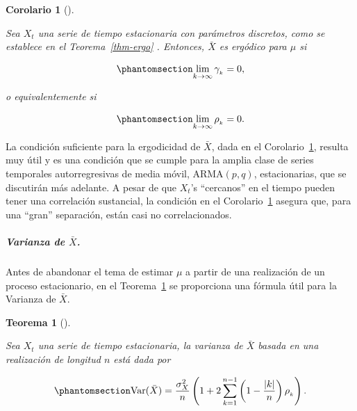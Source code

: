 \documentclass[
  us-letterpaper,
]{scrreprt}
\let\oldsubparagraph\subparagraph
\renewcommand{\subparagraph}[1]{\oldsubparagraph{#1}\mbox{}}
\theoremstyle{plain}
\newtheorem{corollary}{Corolario}[chapter]
\theoremstyle{definition}
\theoremstyle{definition}
\theoremstyle{plain}
\newtheorem{theorem}{Teorema}[chapter]
\theoremstyle{remark}
\begin{document}
\begin{corollary}[]\protect\hypertarget{cor-ergo}{}\label{cor-ergo}

Sea \(X_t\) una serie de tiempo estacionaria con parámetros discretos,
como se establece en el Teorema~\ref{thm-ergo} . Entonces, \(\bar X\) es
ergódico para \(\mu\) si

\begin{equation}\phantomsection\label{eq-ergo1}{
\lim\limits_{k\to\infty} \gamma_{_k}=0,
}\end{equation}

o equivalentemente si

\begin{equation}\phantomsection\label{eq-ergo2}{
\lim\limits_{k\to\infty} \rho_{_k}=0.
}\end{equation}

\end{corollary}

La condición suficiente para la ergodicidad de \(\bar X\), dada en el
Corolario~\ref{cor-ergo}, resulta muy útil y es una condición que se
cumple para la amplia clase de series temporales autorregresivas de
media móvil, ARMA\((p,q)\), estacionarias, que se discutirán más
adelante. A pesar de que \(X_t\)'s ``cercanos'' en el tiempo pueden
tener una correlación sustancial, la condición en el
Corolario~\ref{cor-ergo} asegura que, para una ``gran'' separación,
están casi no correlacionados.

\subparagraph{\texorpdfstring{Varianza de
\(\bar X\).}{Varianza de \textbackslash bar X.}}\label{varianza-de-bar-x.}

Antes de abandonar el tema de estimar \(\mu\) a partir de una
realización de un proceso estacionario, en el Teorema~\ref{thm-varmedia}
se proporciona una fórmula útil para la Varianza de \(\bar X\).

\begin{theorem}[]\protect\hypertarget{thm-varmedia}{}\label{thm-varmedia}

Sea \(X_t\) una serie de tiempo estacionaria, la varianza de \(\bar X\)
basada en una realización de longitud \(n\) está dada por

\begin{equation}\phantomsection\label{eq-varmedia}{
\mathrm{Var}(\bar X)=\frac{\sigma_X^2}{n}\left(1+2\sum_{k=1}^{n-1}\left(1-\frac{|k|}{n}\right)\rho_{_k}\right).
}\end{equation}

\end{theorem}
\end{document}
